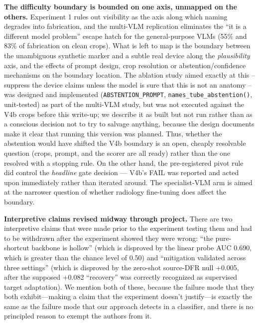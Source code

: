 \documentclass{ieeeaccess}
\begin{document}
\textbf{The difficulty boundary is bounded on one axis, unmapped on the others.} Experiment 1 rules out visibility as the axis along which naming degrades into fabrication, and the multi-VLM replication eliminates the ``it is a different model problem'' escape hatch for the general-purpose VLMs (55\% and 83\% of fabrication on clean crops). What is left to map is the boundary between the unambiguous synthetic marker and a subtle real device along the \emph{plausibility} axis, and the effects of prompt design, crop resolution or abstention/confidence mechanisms on the boundary location. The ablation study aimed exactly at this -- suppress the device claims unless the model is sure that this is not an anatomy -- was designed and implemented (\texttt{ABSTENTION\_PROMPT}, \texttt{names\_tube\_abstention()}, unit-tested) as part of the multi-VLM study, but was not executed against the V4b crops before this write-up; we describe it as built but not run rather than as a conscious decision not to try to salvage anything, because the design documents make it clear that running this version was planned. Thus, whether the abstention would have shifted the V4b boundary is an open, cheaply resolvable question (crops, prompt, and the scorer are all ready) rather than the one resolved with a stopping rule. On the other hand, the pre-registered pivot rule did control the \emph{headline} gate decision --- V4b's FAIL was reported and acted upon immediately rather than iterated around. The specialist-VLM arm is aimed at the narrower question of whether radiology fine-tuning does affect the boundary.

\textbf{Interpretive claims revised midway through project.} There are two interpretive claims that were made prior to the experiment testing them and had to be withdrawn after the experiment showed they were wrong: ``the pure-shortcut backbone is hollow'' (which is disproved by the linear probe AUC 0.690, which is greater than the chance level of 0.50) and ``mitigation validated across three settings'' (which is disproved by the zero-shot source-DFR null +0.005, after the supposed +0.082 ``recovery'' was correctly recognized as supervised target adaptation). We mention both of these, because the failure mode that they both exhibit---making a claim that the experiment doesn't justify---is exactly the same as the failure mode that our approach detects in a classifier, and there is no principled reason to exempt the authors from it.

\end{document}
